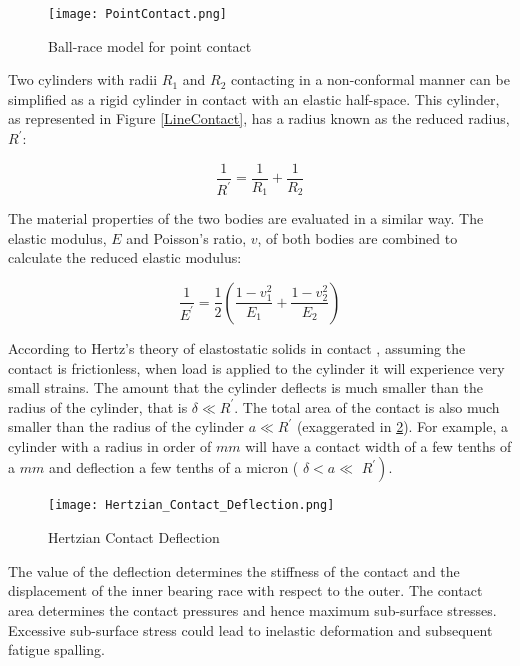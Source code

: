 \begin{figure}
	\centerline{\texttt{[image: PointContact.png]}}
	\caption{Ball-race model for point contact \cite{Zaretsky2016}}
	\label{PointContact}
\end{figure}

Two cylinders with radii $R_1$ and $R_2$ contacting in a non-conformal manner can be simplified as a rigid cylinder in contact with an elastic half-space. This cylinder, as represented in Figure \ref{LineContact}, has a radius known as the reduced radius, $R^{\prime}$:

\begin{equation}\label{eq2.1}
	\frac{1}{R^{\prime}}=\frac{1}{R_1}+\frac{1}{R_2}
\end{equation}

The material properties of the two bodies are evaluated in a similar way. The elastic modulus, $E$ and Poisson's ratio, $v$, of both bodies are combined to calculate the reduced elastic modulus:

\begin{equation}\label{eq2.2}
	\frac{1}{E^{\prime}}=\frac{1}{2}\left(\frac{1-v_1^2}{E_1}+\frac{1-v_2^2}{E_2}\right)
\end{equation}

According to Hertz's theory of elastostatic solids in contact \cite{Hertz1881}, assuming the contact is frictionless, when load is applied to the cylinder it will experience very small strains. The amount that the cylinder deflects is much smaller than the radius of the cylinder, that is $\delta \ll R^{\prime}$. The total area of the contact is also much smaller than the radius of the cylinder $a \ll R^{\prime}$ (exaggerated in \ref{HertzianContactDeflection}). For example, a cylinder with a radius in order of $mm$ will have a contact width of a few tenths of a $mm$ and deflection a few tenths of a micron ( $\delta<a \ll$ $\left.R^{\prime}\right)$.

\begin{figure}
	\centerline{\texttt{[image: Hertzian\_Contact\_Deflection.png]}}
	\caption{Hertzian Contact Deflection}
	\label{HertzianContactDeflection}
\end{figure}

The value of the deflection determines the stiffness of the contact and the displacement of the inner bearing race with respect to the outer. The contact area determines the contact pressures and hence maximum sub-surface stresses. Excessive sub-surface stress could lead to inelastic deformation and subsequent fatigue spalling.

